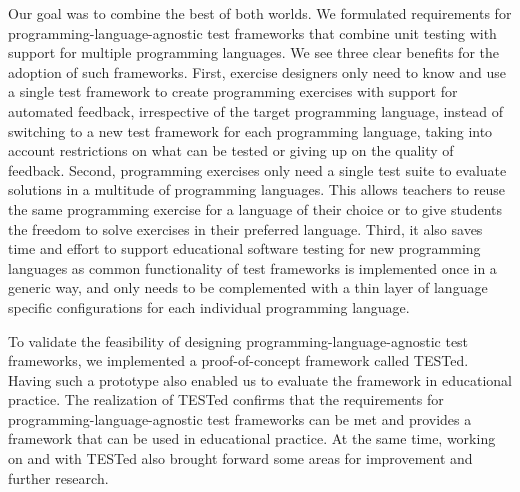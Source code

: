 \documentclass[../main]{subfiles}
\begin{document}
Our goal was to combine the best of both worlds.
We formulated requirements for programming-language-agnostic test frameworks that combine unit testing with support for multiple programming languages.
We see three clear benefits for the adoption of such frameworks.
First, exercise designers only need to know and use a single test framework to create programming exercises with support for automated feedback, irrespective of the target programming language, instead of switching to a new test framework for each programming language, taking into account restrictions on what can be tested or giving up on the quality of feedback.
Second, programming exercises only need a single test suite to evaluate solutions in a multitude of programming languages.
This allows teachers to reuse the same programming exercise for a language of their choice or to give students the freedom to solve exercises in their preferred language.
Third, it also saves time and effort to support educational software testing for new programming languages as common functionality of test frameworks is implemented once in a generic way, and only needs to be complemented with a thin layer of language specific configurations for each individual programming language.

To validate the feasibility of designing programming-language-agnostic test frameworks, we implemented a proof-of-concept framework called TESTed.
Having such a prototype also enabled us to evaluate the framework in educational practice.
The realization of TESTed confirms that the requirements for programming-language-agnostic test frameworks can be met and provides a framework that can be used in educational practice.
At the same time, working on and with TESTed also brought forward some areas for improvement and further research.
\end{document}
